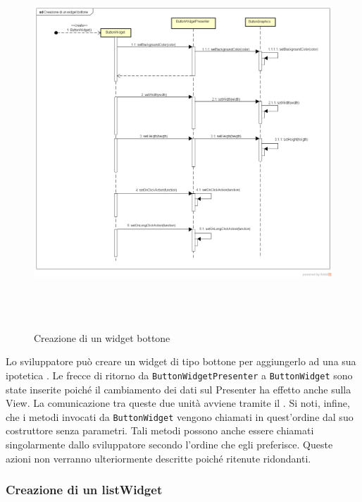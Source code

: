 \label{Creazione di un widget bottone}
\begin{figure}[ht]
	\centering
	\includegraphics[width=16cm, height=14cm]{Sezioni/Diagrammi/img/Creazione di un widget bottone.png}
	\caption{Creazione di un widget bottone}
\end{figure}

Lo sviluppatore può creare un widget di tipo bottone per aggiungerlo ad una sua ipotetica .
Le frecce di ritorno da \texttt{ButtonWidgetPresenter}  a \texttt{ButtonWidget} sono state inserite poiché il cambiamento dei dati sul Presenter ha effetto anche sulla View. La comunicazione tra queste due unità avviene tramite il  .
Si noti, infine, che i metodi invocati da \texttt{ButtonWidget} vengono chiamati in quest'ordine dal suo costruttore senza parametri. Tali metodi possono anche essere chiamati singolarmente dallo sviluppatore secondo l'ordine che egli preferisce. Queste azioni non verranno ulteriormente descritte poiché ritenute ridondanti.

\newpage

\subsubsection{Creazione di un listWidget}

